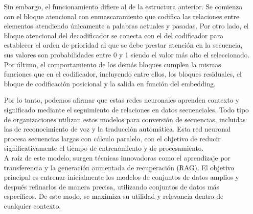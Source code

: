 \begin{itemize}
	Sin embargo, el funcionamiento difiere al de la estructura anterior. Se comienza con el bloque atencional con enmascaramiento que codifica las relaciones entre elementos atendiendo únicamente a palabras actuales y pasadas. Por otro lado, el bloque atencional del decodificador se conecta con el del codificador para establecer el orden de prioridad al que se debe prestar atención en la secuencia, sus valores son probabilidades entre 0 y 1 siendo el valor más alto el seleccionado. Por último, el comportamiento de los demás bloques cumplen la mismas funciones que en el codificador, incluyendo entre ellos, los bloques residuales, el bloque de codificación posicional y la salida en función del embedding.  \\
	
\end{itemize}


Por lo tanto, podemos afirmar que estas redes neuronales aprenden contexto y significado mediante el seguimiento de relaciones en datos secuenciales. Todo tipo de organizaciones utilizan estos modelos para conversión de secuencias, incluidas las de reconocimiento de voz y la traducción automática. Esta red neuronal procesa secuencias largas con cálculo paralelo, con el objetivo de reducir significativamente el tiempo de entrenamiento y de procesamiento.\\

A raíz de este modelo, surgen técnicas innovadoras como el aprendizaje por transferencia y la generación aumentada de recuperación (RAG). El objetivo principal es entrenar inicialmente los modelos de conjuntos de datos amplios y después refinarlos de manera precisa, utilizando conjuntos de datos más específicos. De este modo, se maximiza su utilidad y relevancia dentro de cualquier contexto.\\

